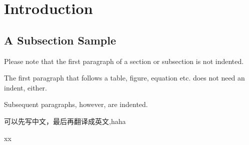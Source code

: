 \section{Introduction}
\subsection{A Subsection Sample}
Please note that the first paragraph of a section or subsection is not indented. 

The first paragraph that follows a table, figure,
equation etc. does not need an indent, either.

Subsequent paragraphs, however, are indented.

可以先写中文，最后再翻译成英文,haha\cite{hjalmarsson1996dea}

xx